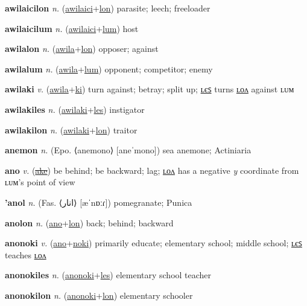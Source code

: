 \textbf{\hypertarget{awilaicilon}{awilaicilon}} \textit{n.} (\hyperlink{awilaici}{awilaici}+\allowbreak \hyperlink{lon}{lon})
parasite; leech; freeloader

\textbf{\hypertarget{awilaicilum}{awilaicilum}} \textit{n.} (\hyperlink{awilaici}{awilaici}+\allowbreak \hyperlink{lum}{lum})
host

\textbf{\hypertarget{awilalon}{awilalon}} \textit{n.} (\hyperlink{awila}{awila}+\allowbreak \hyperlink{lon}{lon})
opposer; against

\textbf{\hypertarget{awilalum}{awilalum}} \textit{n.} (\hyperlink{awila}{awila}+\allowbreak \hyperlink{lum}{lum})
opponent; competitor; enemy

\textbf{\hypertarget{awilaki}{awilaki}} \textit{v.} (\hyperlink{awila}{awila}+\allowbreak \hyperlink{ki}{ki})
turn against; betray; split up; \hyperlink{awilakiles}{ʟєꜱ} turns \hyperlink{awilakilon}{ʟᴏᴧ} against ʟᴜᴍ

\textbf{\hypertarget{awilakiles}{awilakiles}} \textit{n.} (\hyperlink{awilaki}{awilaki}+\allowbreak \hyperlink{les}{les})
instigator

\textbf{\hypertarget{awilakilon}{awilakilon}} \textit{n.} (\hyperlink{awilaki}{awilaki}+\allowbreak \hyperlink{lon}{lon})
traitor

\textbf{\hypertarget{anemon}{anemon}} \textit{n.} (Epo. ⟨anemono⟩ [aneˈmono])
sea anemone; Actiniaria

\textbf{\hypertarget{ano}{ano}} \textit{v.} (\hyperlink{ake}{\sout{ake}})
be behind; be backward; lag; \hyperlink{anolon}{ʟᴏᴧ} has a negative \textit{y} coordinate from ʟᴜᴍ’s point of view

\textbf{\hypertarget{'anol}{'anol}} \textit{n.} (Fas. ⟨{\arabics{}انار}⟩ [æˈnɒːɾ])
pomegranate; Punica

\textbf{\hypertarget{anolon}{anolon}} \textit{n.} (\hyperlink{ano}{ano}+\allowbreak \hyperlink{lon}{lon})
back; behind; backward

\textbf{\hypertarget{anonoki}{anonoki}} \textit{v.} (\hyperlink{ano}{ano}+\allowbreak \hyperlink{noki}{noki})
primarily educate; elementary school; middle school; \hyperlink{anonokiles}{ʟєꜱ} teaches \hyperlink{anonokilon}{ʟᴏᴧ}

\textbf{\hypertarget{anonokiles}{anonokiles}} \textit{n.} (\hyperlink{anonoki}{anonoki}+\allowbreak \hyperlink{les}{les})
elementary school teacher

\textbf{\hypertarget{anonokilon}{anonokilon}} \textit{n.} (\hyperlink{anonoki}{anonoki}+\allowbreak \hyperlink{lon}{lon})
elementary schooler

